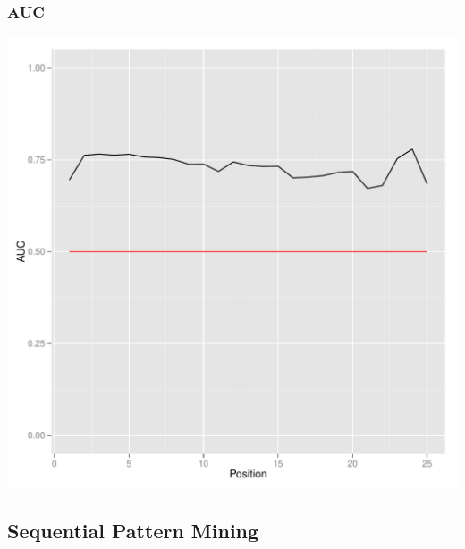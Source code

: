 
\begin{frame}\frametitle{AUC}
	\centering\includegraphics[scale=0.39]{auc.pdf}
\end{frame}

\subsection{Sequential Pattern Mining}


